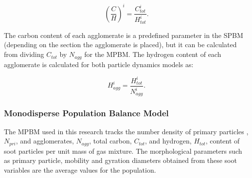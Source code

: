 \begin{equation}
	\left(
		\frac{C}{H}
	\right)^i
	=\frac{C^i_{tot}}{H^i_{tot}}   
	\label{eqn:CtoH}.
\end{equation}

The carbon content of each agglomerate is a predefined parameter in the SPBM (depending on the section the agglomerate is placed), but it can be calculated from dividing ${C_{tot}}$ by ${N_{agg}}$ for the MPBM. The hydrogen content of each agglomerate is calculated for both particle dynamics models as:

\begin{equation}
	H^i_{agg}
	=\frac{H^i_{tot}}{N^i_{agg}}   
	\label{eqn:Hagg}.
\end{equation}


\subsubsection{Monodisperse Population Balance Model}
The MPBM used in this research tracks the number density of primary particles ,$N_{pri}$, and agglomerates, $N_{agg}$, total carbon, $C_{tot}$, and hydrogen, $H_{tot}$, content of soot particles per unit mass of gas mixture. The morphological parameters such as primary particle, mobility and gyration diameters obtained from these soot variables are the average values for the population.

